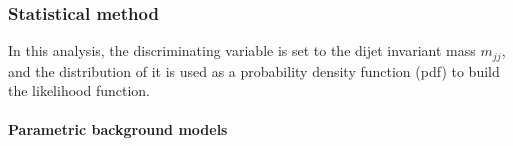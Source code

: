 %
\subsubsection{Statistical method} 

In this analysis, the discriminating variable is set to the dijet invariant mass $m_{jj}$, and the distribution of it is used as  a probability density function (pdf) to build the likelihood function.

\paragraph{Parametric background models}\mbox{}\par



